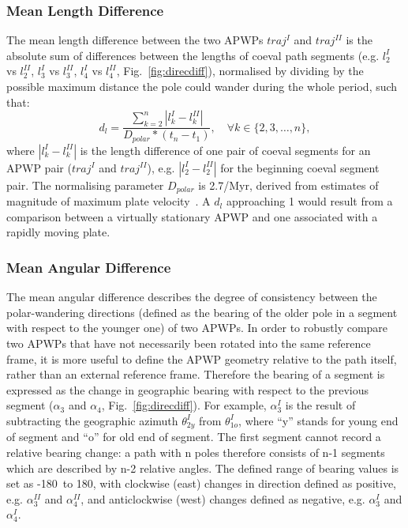 \subsubsection{Mean Length Difference}
The mean length difference between the two APWPs $traj^I$ and $traj^{II}$ is the
absolute sum of differences between the lengths of coeval path segments (e.g.
$l_2^I$ vs $l_2^{II}$, $l_3^I$ vs $l_3^{II}$, $l_4^I$ vs $l_4^{II}$,
Fig.~\ref{fig:direcdiff}), normalised by dividing by the possible maximum
distance the pole could wander during the whole period, such that:
%
\begin{equation*}
  d_l = \frac{\sum\limits_{k=2}^n | l_k^I - l_k^{II} |}{D_{polar} * (t_n-t_1)} ,
  \quad\forall k \in \{2,3,\ldots,n\},
\label{eq:ld}
\end{equation*}
%
where $|l_k^I - l_k^{II}|$ is the length difference of one pair of coeval
segments for an APWP pair ($traj^I$ and $traj^{II}$), e.g. $|l_2^I - l_2^{II}|$
for the beginning coeval segment pair. The normalising parameter $D_{polar}$ is
2.7\degree/Myr, derived from estimates of magnitude of maximum plate
velocity~\cite[up to about 30 cm/year]{S09,K14}. A $d_l$ approaching 1 would
result from a comparison between a virtually stationary APWP and one associated
with a rapidly moving plate.

\subsubsection{Mean Angular Difference}

The mean angular difference describes the degree of consistency between the
polar-wandering directions (defined as the bearing of the older pole in a
segment with respect to the younger one) of two APWPs. In order to robustly
compare two APWPs that have not necessarily been rotated into the same reference
frame, it is more useful to define the APWP geometry relative to the path
itself, rather than an external reference frame. Therefore the bearing of a
segment is expressed as the change in geographic bearing with respect to the
previous segment ($\alpha_3$ and $\alpha_4$, Fig.~\ref{fig:direcdiff}). For
example, $\alpha_3^I$ is the result of subtracting the geographic azimuth
$\theta_{2y}^I$ from $\theta_{1o}^I$, where ``y'' stands for young end of
segment and ``o'' for old end of segment. The first segment cannot record a
relative bearing change: a path with n poles therefore consists of n-1 segments
which are described by n-2 relative angles. The defined range of bearing values
is set as -180\degree\ to 180\degree, with clockwise (east) changes in direction
defined as positive, e.g. {\bf $\alpha_3^{II}$} and {\bf $\alpha_4^{II}$}, and
anticlockwise (west) changes defined as negative, e.g. {\bf $\alpha_3^I$} and
{\bf $\alpha_4^I$}.

